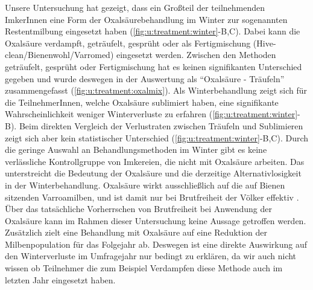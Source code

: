 
Unsere Untersuchung hat gezeigt, dass ein Großteil der teilnehmenden ImkerInnen eine Form der Oxalsäurebehandlung im Winter zur sogenannten Restentmilbung eingesetzt haben (\cref{fig:u:treatment:winter}-B,C). Dabei kann die Oxalsäure verdampft, geträufelt, gesprüht oder als Fertigmischung (Hive-clean/Bienenwohl/Varromed) eingesetzt werden. Zwischen den Methoden geträufelt, gesprüht oder Fertigmischung hat es keinen signifikanten Unterschied gegeben und wurde deswegen in der Auswertung als \enquote{Oxalsäure - Träufeln} zusammengefasst (\cref{fig:u:treatment:oxalmix}).
\newline
Als Winterbehandlung zeigt sich für die TeilnehmerInnen, welche Oxalsäure sublimiert haben, eine signifikante Wahrscheinlichkeit weniger Winterverluste zu erfahren (\cref{fig:u:treatment:winter}-B). Beim direkten Vergleich der Verlustraten zwischen Träufeln und Sublimieren zeigt sich aber kein statistischer Unterschied (\cref{fig:u:treatment:winter}-B,C).
\newline
Durch die geringe Auswahl an Behandlungsmethoden im Winter gibt es keine verlässliche Kontrollgruppe von Imkereien, die nicht mit Oxalsäure arbeiten. Das unterstreicht die Bedeutung der Oxalsäure und die derzeitige Alternativlosigkeit in der Winterbehandlung. Oxalsäure wirkt ausschließlich auf die auf Bienen sitzenden Varroamilben, und ist damit nur bei Brutfreiheit der Völker effektiv \citep{rosenkranz2010}. Über das tatsächliche Vorherrschen von Brutfreiheit bei Anwendung der Oxalsäure kann im Rahmen dieser Untersuchung keine Aussage getroffen werden. Zusätzlich zielt eine Behandlung mit Oxalsäure auf eine Reduktion der Milbenpopulation für das Folgejahr ab. Deswegen ist eine direkte Auswirkung auf den Winterverluste im Umfragejahr nur bedingt zu erklären, da wir auch nicht wissen ob Teilnehmer die zum Beispiel Verdampfen diese Methode auch im letzten Jahr eingesetzt haben.


